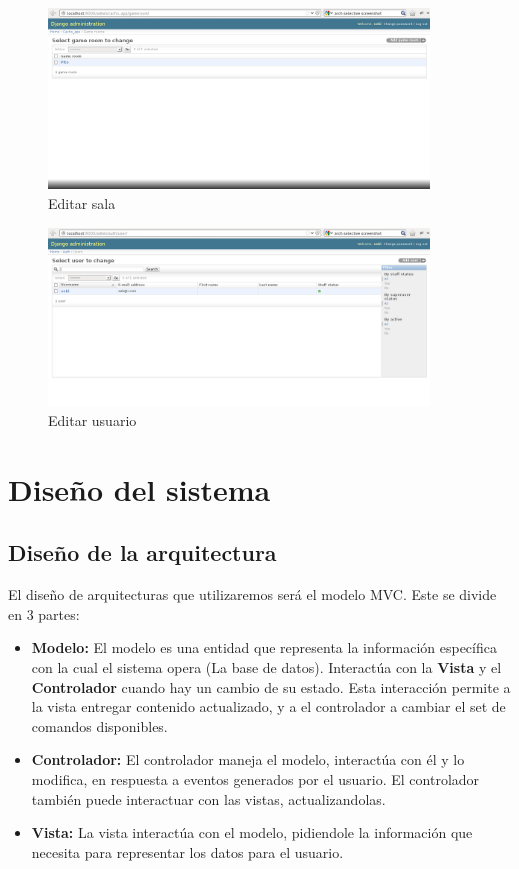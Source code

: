 \documentclass[a4paper,11pt]{article}
\begin{document}
\begin{figure}[h!]
	\centering
	\includegraphics[width=0.9\textwidth]{Admin_room_cp.png}
	\caption{Editar sala}
\end{figure}
\begin{figure}[h!]
	\centering
	\includegraphics[width=0.9\textwidth]{Admin_user_cp.png}
	\caption{Editar usuario}
\end{figure}

\newpage

\section{Diseño del sistema}
\subsection{Diseño de la arquitectura}
	El diseño de arquitecturas que utilizaremos será el modelo MVC. 
Este se divide en 3 partes:
\begin{itemize}
	\item \textbf{Modelo:} El modelo es una entidad que representa la 
información específica con la cual el sistema opera (La base de datos). 
Interactúa con la \textbf{Vista} y el \textbf{Controlador} cuando hay un cambio
de su estado. Esta interacción permite a la vista entregar contenido actualizado, 
y a el controlador a cambiar el set de comandos disponibles. \\
	\item \textbf{Controlador:} El controlador maneja el modelo, 
interactúa con él y lo modifica, en respuesta a  eventos generados por el 
usuario. El controlador también puede interactuar con las vistas, 
actualizandolas. \\
	\item \textbf{Vista:} La vista interactúa con el modelo, pidiendole la
información que necesita para representar los datos para el usuario. \\
\end{itemize}
\end{document}

